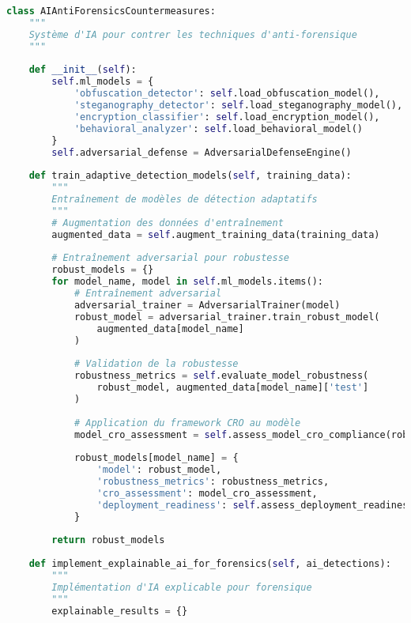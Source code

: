 \begin{lstlisting}[language=Python, caption=Système d'IA pour contrer l'anti-forensique]
class AIAntiForensicsCountermeasures:
    """
    Système d'IA pour contrer les techniques d'anti-forensique
    """
    
    def __init__(self):
        self.ml_models = {
            'obfuscation_detector': self.load_obfuscation_model(),
            'steganography_detector': self.load_steganography_model(),
            'encryption_classifier': self.load_encryption_model(),
            'behavioral_analyzer': self.load_behavioral_model()
        }
        self.adversarial_defense = AdversarialDefenseEngine()
        
    def train_adaptive_detection_models(self, training_data):
        """
        Entraînement de modèles de détection adaptatifs
        """
        # Augmentation des données d'entraînement
        augmented_data = self.augment_training_data(training_data)
        
        # Entraînement adversarial pour robustesse
        robust_models = {}
        for model_name, model in self.ml_models.items():
            # Entraînement adversarial
            adversarial_trainer = AdversarialTrainer(model)
            robust_model = adversarial_trainer.train_robust_model(
                augmented_data[model_name]
            )
            
            # Validation de la robustesse
            robustness_metrics = self.evaluate_model_robustness(
                robust_model, augmented_data[model_name]['test']
            )
            
            # Application du framework CRO au modèle
            model_cro_assessment = self.assess_model_cro_compliance(robust_model)
            
            robust_models[model_name] = {
                'model': robust_model,
                'robustness_metrics': robustness_metrics,
                'cro_assessment': model_cro_assessment,
                'deployment_readiness': self.assess_deployment_readiness(robust_model)
            }
            
        return robust_models
    
    def implement_explainable_ai_for_forensics(self, ai_detections):
        """
        Implémentation d'IA explicable pour forensique
        """
        explainable_results = {}
        

\end{lstlisting}
